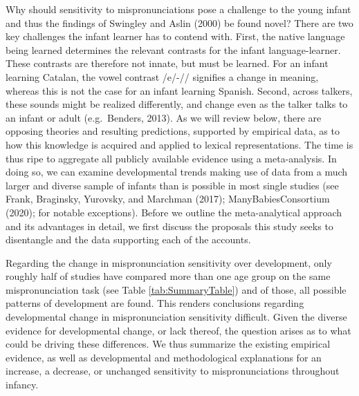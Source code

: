 \documentclass[man]{apa6}
\begin{document}
Why should sensitivity to mispronunciations pose a challenge to the young infant and thus the findings of Swingley and Aslin (2000) be found novel? There are two key challenges the infant learner has to contend with. First, the native language being learned determines the relevant contrasts for the infant language-learner. These contrasts are therefore not innate, but must be learned. For an infant learning Catalan, the vowel contrast /e/-// signifies a change in meaning, whereas this is not the case for an infant learning Spanish. Second, across talkers, these sounds might be realized differently, and change even as the talker talks to an infant or adult (e.g.~Benders, 2013). As we will review below, there are opposing theories and resulting predictions, supported by empirical data, as to how this knowledge is acquired and applied to lexical representations. The time is thus ripe to aggregate all publicly available evidence using a meta-analysis. In doing so, we can examine developmental trends making use of data from a much larger and diverse sample of infants than is possible in most single studies (see Frank, Braginsky, Yurovsky, and Marchman (2017); ManyBabiesConsortium (2020); for notable exceptions). Before we outline the meta-analytical approach and its advantages in detail, we first discuss the proposals this study seeks to disentangle and the data supporting each of the accounts.

Regarding the change in mispronunciation sensitivity over development, only roughly half of studies have compared more than one age group on the same mispronunciation task (see Table \ref{tab:SummaryTable}) and of those, all possible patterns of development are found. This renders conclusions regarding developmental change in mispronunciation sensitivity difficult. Given the diverse evidence for developmental change, or lack thereof, the question arises as to what could be driving these differences. We thus summarize the existing empirical evidence, as well as developmental and methodological explanations for an increase, a decrease, or unchanged sensitivity to mispronunciations throughout infancy.
\end{document}
